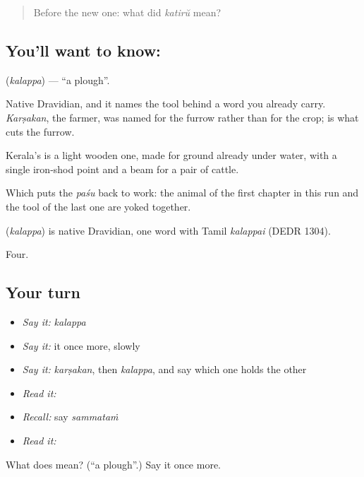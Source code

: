 \begin{quote}
Before the new one: what did \emph{katirŭ} mean?
\end{quote}

\subsection*{You'll want to know: }
\textbf{} (\emph{kalappa}) — \textquotedblleft{}a plough\textquotedblright{}.

Native Dravidian, and it names the tool behind a word you already carry. \emph{Karṣakan}, the farmer, was named for the furrow rather than for the crop;  is what cuts the furrow.

Kerala's is a light wooden one, made for ground already under water, with a single iron-shod point and a beam for a pair of cattle.

Which puts the \emph{paśu} back to work: the animal of the first chapter in this run and the tool of the last one are yoked together.

\begin{cousinweb}
\textbf{} (\emph{kalappa}) is native Dravidian, one word with Tamil \emph{kalappai} (DEDR 1304).
\end{cousinweb}

\begin{grammarlens}[title={What you've built}]
Four.
\end{grammarlens}

\subsection*{Your turn}
\begin{itemize}
\raggedright
  \item \emph{Say it:} \emph{kalappa}
  \item \emph{Say it:} it once more, slowly
  \item \emph{Say it:} \emph{karṣakan}, then \emph{kalappa}, and say which one holds the other
  \item \emph{Read it:} \textbf{}
  \item \emph{Recall:} say \emph{sammataṁ}
  \item \emph{Read it:} \textbf{}
\end{itemize}

\begin{tcolorbox}[breakable,colback=teal!4,colframe=teal!35!black,title={Before you move on}]
What does  mean? (\textquotedblleft{}a plough\textquotedblright{}.) Say it once more.
\end{tcolorbox}
